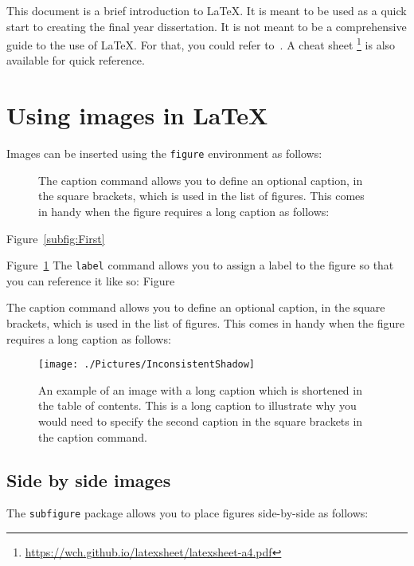 This document is a brief introduction to \LaTeX. It is meant to be used as a quick start to creating the final year dissertation. It is not meant to be a comprehensive guide to the use of \LaTeX. For that, you could refer to~\cite{Oetiker2015}. A cheat sheet \footnote{\url{https://wch.github.io/latexsheet/latexsheet-a4.pdf}} is also available for quick reference.

\section{Using images in \LaTeX}

Images can be inserted using the \texttt{figure} environment as follows:

\begin{figure}[t]
	\centering
	 \quad
	\caption[A short caption]{The caption command allows you to define an optional caption, in the square brackets, which is used in the list of figures. This comes in handy when the figure requires a long caption as follows:\label{Fig:Image1}}
\end{figure}

Figure~\ref{subfig:First}

\noindent Figure~\ref{Fig:Image1} The \texttt{label} command allows you to assign a label to the figure so that you can reference it like so: Figure

The caption command allows you to define an optional caption, in the square brackets, which is used in the list of figures. This comes in handy when the figure requires a long caption as follows:

\begin{figure}[h!]
	\centering
	\texttt{[image: ./Pictures/InconsistentShadow]}
	\caption{An example of an image with a long caption which is shortened in the table of contents. This is a long caption to illustrate why you would need to specify the second caption in the square brackets in the caption command.}\label{Fig:ImageLongCaption}
\end{figure}
\subsection{Side by side images}

The \texttt{subfigure} package allows you to place figures side-by-side as follows:


